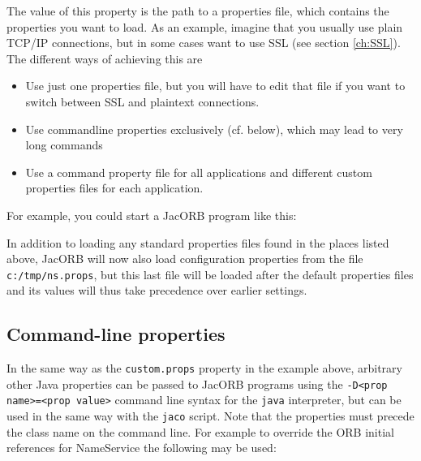 The value of this property is the path to a properties file, which
contains the properties you want to load. As an example, imagine that
you usually use plain TCP/IP connections, but in some cases want to
use SSL (see section \ref{ch:SSL}). The different ways of achieving
this are

\begin{itemize}
\item Use just one properties file, but you will have to edit that
  file if you want to switch between SSL and
plaintext connections.
\item Use commandline properties exclusively (cf. below), which may lead to very long
commands
\item Use a command property file for all applications and different
  custom properties files for each application.
\end{itemize}

For example, you could start a JacORB program like this:


In addition to loading any standard properties files found in the
places listed above, JacORB will now also load configuration
properties from the file {\tt c:/tmp/ns.props}, but this last file
will be loaded after the default properties files and its values will
thus take precedence over earlier settings.

\subsection{Command-line properties}

In the same way as the {\tt custom.props} property in the example
above, arbitrary other Java properties can be passed to JacORB
programs using the {\tt -D<prop name>=<prop value>} command line
syntax for the {\tt java} interpreter, but can be used in the same way
with the {\tt jaco} script. Note that the properties must precede
the class name on the command line. For example to override the
ORB initial references for NameService the following may be used:

